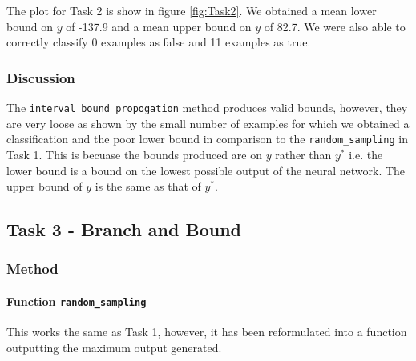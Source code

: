 \documentclass[11pt]{article}
\begin{document}
The plot for Task 2 is show in figure \ref{fig:Task2}. 
We obtained a mean lower bound on $y$ of -137.9 and a mean upper bound on $y$ of 82.7. 
We were also able to correctly classify 0 examples as false and 11 examples as true. 
\subsubsection{Discussion}
The \texttt{interval\_bound\_propogation} method produces valid bounds, however, they are very loose as shown by the small number of examples for which we obtained a classification and the poor lower bound in comparison to the \texttt{random\_sampling} in Task 1.
This is becuase the bounds produced are on $y$ rather than $y^*$ 
i.e. the lower bound is a bound on the lowest possible output of the neural network. The upper bound of $y$ is the same as that of $y^*$.


\subsection{Task 3 - Branch and Bound}
\subsubsection{Method}
\paragraph{Function \texttt{random\_sampling}}
This works the same as Task 1, however, it has been reformulated into a function outputting the maximum output generated.
\end{document}
